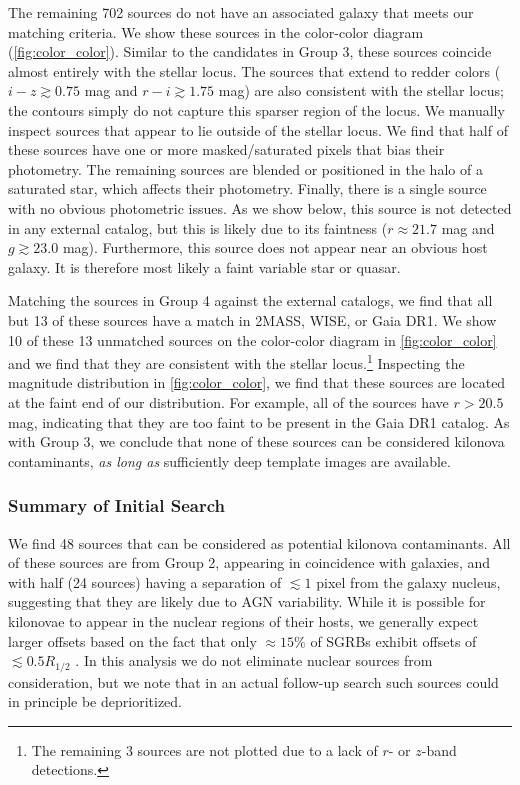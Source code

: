 The remaining 702 sources do not have an associated galaxy that meets our matching criteria. We show these sources in the color-color diagram (\autoref{fig:color_color}). Similar to the candidates in Group 3, these sources coincide almost entirely with the stellar locus. The sources that extend to redder colors ($i-z \gtrsim 0.75$ mag and $r-i \gtrsim 1.75$ mag) are also consistent with the stellar locus; the contours simply do not capture this sparser region of the locus. We manually inspect sources that appear to lie outside of the stellar locus. We find that half of these sources have one or more masked/saturated pixels that bias their photometry. The remaining sources are blended or positioned in the halo of a saturated star, which affects their photometry. Finally, there is a single source with no obvious photometric issues. As we show below, this source is not detected in any external catalog, but this is likely due to its faintness ($r \approx 21.7$ mag and $g \gtrsim 23.0$ mag). Furthermore, this source does not appear near an obvious host galaxy. It is therefore most likely a faint variable star or quasar. 

Matching the sources in Group 4 against the external catalogs, we find that all but 13 of these sources have a match in 2MASS, WISE, or Gaia DR1. We show 10 of these 13 unmatched sources on the color-color diagram in \autoref{fig:color_color} and we find that they are consistent with the stellar locus.\footnote{The remaining 3 sources are not plotted due to a lack of $r$- or $z$-band detections.} Inspecting the magnitude distribution in \autoref{fig:color_color}, we find that these sources are located at the faint end of our distribution. For example, all of the sources have $r > 20.5$ mag, indicating that they are too faint to be present in the Gaia DR1 catalog. As with Group 3, we conclude that none of these sources can be considered kilonova contaminants, {\it as long as} sufficiently deep template images are available. 

\subsubsection{Summary of Initial Search}
\label{sec:search_summary}
We find 48 sources that can be considered as potential kilonova contaminants. All of these sources are from Group 2, appearing in coincidence with galaxies, and with half (24 sources) having a separation of $\lesssim 1$ pixel from the galaxy nucleus, suggesting that they are likely due to AGN variability. While it is possible for kilonovae to appear in the nuclear regions of their hosts, we generally expect larger offsets based on the fact that only $\approx 15\%$ of SGRBs exhibit offsets of $\lesssim 0.5 R_{1/2}$ \citep{fong13,fong+13,berger14}. In this analysis we do not eliminate nuclear sources from consideration, but we note that in an actual follow-up search such sources could in principle be deprioritized.

